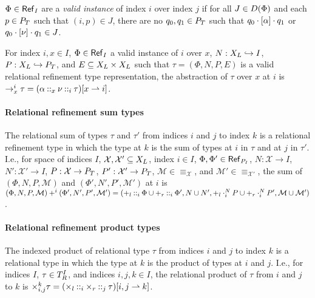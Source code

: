$\Phi \in \mathsf{Ref}_{ I }$ are a \emph{valid instance} of index $i$
over index $j$ if for all $J \in D(\Phi)$ and each
$p \in P_T$ such that $(i, p) \in J$, there are no
$q_0, q_1 \in P_T$ such that
$q_0 \cdot [ \alpha ] \cdot q_1$ or
$q_0 \cdot [ \nu ] \cdot q_1 \in J$.

For index $i, x \in I$, %
$\Phi \in \mathsf{Ref}_{I}$ a valid instance of $i$ over $x$, %
$N : X_L \hookrightarrow I$, %
$P : X_L \hookrightarrow P_T$, and %
$E \subseteq X_L \times X_L$ such that
$\tau = (\Phi, N, P, E)$ is a valid relational refinement type
representation, the abstraction of $\tau$ over $x$ at $i$ is
$\to_x^i \tau =  (\alpha \mathbin{::}_{x} \nu
  \mathbin{::}_{i} \tau)[  x  \rightharpoonup  i  ]$.

\paragraph{Relational refinement sum types} The relational sum of
types $\tau$ and $\tau'$ from indices $i$ and $j$ to index $k$ is a
relational refinement type in which the type at $k$ is the sum of
types at $i$ in $\tau$ and at $j$ in $\tau'$.
%
I.e., for space of indices $I$,
$\mathcal{X}, \mathcal{X}' \subseteq X_L$, index $i \in I$,
$\Phi, \Phi' \in \mathsf{Ref}_{ P_{I} }$,
$N : \mathcal{X} \to I$, $N' : \mathcal{X}' \to I$,
$P : \mathcal{X} \to P_T$, $P' : \mathcal{X}' \to P_T$, 
$\mathcal{M} \in \equiv_{\mathcal{X}}$, and
$\mathcal{M}' \in \equiv_{\mathcal{X}'}$, the sum of
$(\Phi, N, P, \mathcal{M})$ and $(\Phi', N', P', \mathcal{M}')$ at $i$
is $(\Phi, N, P, \mathcal{M}) +^i (\Phi', N', P', \mathcal{M}') = %
(\tyleftsum \prepend{i} \Phi \union \tyrightsum \prepend{i} \Phi',
N \union N',
\tyleftsum \fullprepend{i}{N} P \union \tyrightsum \fullprepend{i}{N}
P',
\mathcal{M} \union \mathcal{M}')$.

\paragraph{Relational refinement product types}
The indexed product of relational type $\tau$ from indices $i$ and $j$
to index $k$ is a relational type in which the type at $k$ is the
product of types at $i$ and $j$.
%
I.e., for indices $I$, $\tau \in T_{R}^{I}$, and indices
$i, j, k \in I$, the relational product of $\tau$ from $i$ and $j$ to
$k$ is
$\times_{i, j}^k \tau =  (\times_l \mathbin{::}_{i} \times_r
  \mathbin{::}_{j} \tau)[  i, j  \rightharpoonup k ]$.

